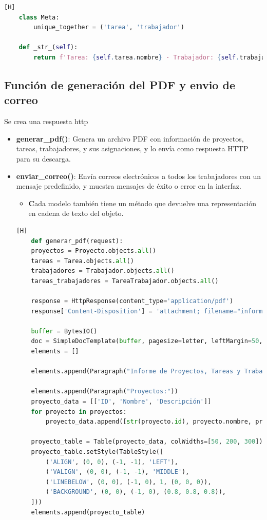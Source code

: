 \documentclass{article}
\begin{document}
\begin{itemize}
\begin{lstlisting}[language=Python,caption={models.py}][H]
    class Meta:
        unique_together = ('tarea', 'trabajador')

    def _str_(self):
        return f'Tarea: {self.tarea.nombre} - Trabajador: {self.trabajador.nombre}'
    \end{lstlisting}

\subsection{Función de generación del PDF y envio de correo}
Se crea una respuesta http

\begin{itemize}
    \item \textbf{generar\_pdf()}:
Genera un archivo PDF con información de proyectos, tareas, trabajadores, y sus asignaciones, y lo envía como respuesta HTTP para su descarga.

    \item \textbf{enviar\_correo()}:
Envía correos electrónicos a todos los trabajadores con un mensaje predefinido, y muestra mensajes de éxito o error en la interfaz.

\begin{itemize}
 \item \textbf Cada modelo también tiene un método que devuelve una representación en cadena de texto del objeto.
\end{itemize}

    \begin{lstlisting}[language=Python,caption={views.py}][H]
	def generar_pdf(request):
    proyectos = Proyecto.objects.all()
    tareas = Tarea.objects.all()
    trabajadores = Trabajador.objects.all()
    tareas_trabajadores = TareaTrabajador.objects.all()

    response = HttpResponse(content_type='application/pdf')
    response['Content-Disposition'] = 'attachment; filename="informe_proyectos_tareas.pdf"'

    buffer = BytesIO()
    doc = SimpleDocTemplate(buffer, pagesize=letter, leftMargin=50, rightMargin=50, topMargin=50, bottomMargin=50)
    elements = []

    elements.append(Paragraph("Informe de Proyectos, Tareas y Trabajadores"))

    elements.append(Paragraph("Proyectos:"))
    proyecto_data = [['ID', 'Nombre', 'Descripción']]
    for proyecto in proyectos:
        proyecto_data.append([str(proyecto.id), proyecto.nombre, proyecto.descripcion])

    proyecto_table = Table(proyecto_data, colWidths=[50, 200, 300])
    proyecto_table.setStyle(TableStyle([
        ('ALIGN', (0, 0), (-1, -1), 'LEFT'),
        ('VALIGN', (0, 0), (-1, -1), 'MIDDLE'),
        ('LINEBELOW', (0, 0), (-1, 0), 1, (0, 0, 0)),
        ('BACKGROUND', (0, 0), (-1, 0), (0.8, 0.8, 0.8)),
    ]))
    elements.append(proyecto_table)


\end{lstlisting}
\end{itemize}
\end{itemize}
\end{document}
